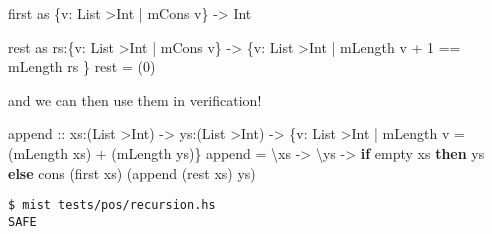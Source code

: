 \documentclass[
]{darts-v2021}
\newenvironment{Shaded}{}{}
\newcommand{\DataTypeTok}[1]{\textcolor[rgb]{0.56,0.13,0.00}{#1}}
\newcommand{\DecValTok}[1]{\textcolor[rgb]{0.25,0.63,0.44}{#1}}
\newcommand{\KeywordTok}[1]{\textcolor[rgb]{0.00,0.44,0.13}{\textbf{#1}}}
\newcommand{\NormalTok}[1]{#1}
\newcommand{\OperatorTok}[1]{\textcolor[rgb]{0.40,0.40,0.40}{#1}}
\newcommand{\OtherTok}[1]{\textcolor[rgb]{0.00,0.44,0.13}{#1}}
\begin{document}
\begin{Shaded}
\begin{Highlighting}[numbers=left,,firstnumber=17,]
\NormalTok{first as \{v}\OperatorTok{:} \DataTypeTok{List} \OperatorTok{\textgreater{}}\DataTypeTok{Int} \OperatorTok{|}\NormalTok{ mCons v\} }\OtherTok{{-}\textgreater{}} \DataTypeTok{Int}
\end{Highlighting}
\end{Shaded}

\begin{Shaded}
\begin{Highlighting}[numbers=left,,firstnumber=20,]
\NormalTok{rest as rs}\OperatorTok{:}\NormalTok{\{v}\OperatorTok{:} \DataTypeTok{List} \OperatorTok{\textgreater{}}\DataTypeTok{Int} \OperatorTok{|}\NormalTok{ mCons v\}}
  \OtherTok{{-}\textgreater{}}\NormalTok{ \{v}\OperatorTok{:} \DataTypeTok{List} \OperatorTok{\textgreater{}}\DataTypeTok{Int} \OperatorTok{|}\NormalTok{ mLength v }\OperatorTok{+} \DecValTok{1} \OperatorTok{==}\NormalTok{ mLength rs \}}
\NormalTok{rest }\OtherTok{=}\NormalTok{ (}\DecValTok{0}\NormalTok{)}
\end{Highlighting}
\end{Shaded}

and we can then use them in verification!

\begin{Shaded}
\begin{Highlighting}[numbers=left,,firstnumber=24,]
\OtherTok{append ::}\NormalTok{ xs}\OperatorTok{:}\NormalTok{(}\DataTypeTok{List} \OperatorTok{\textgreater{}}\DataTypeTok{Int}\NormalTok{)}
  \OtherTok{{-}\textgreater{}}\NormalTok{ ys}\OperatorTok{:}\NormalTok{(}\DataTypeTok{List} \OperatorTok{\textgreater{}}\DataTypeTok{Int}\NormalTok{)}
  \OtherTok{{-}\textgreater{}}\NormalTok{ \{v}\OperatorTok{:} \DataTypeTok{List} \OperatorTok{\textgreater{}}\DataTypeTok{Int} \OperatorTok{|}\NormalTok{ mLength v }\OtherTok{=}\NormalTok{ (mLength xs) }\OperatorTok{+}\NormalTok{ (mLength ys)\}}
\NormalTok{append }\OtherTok{=}\NormalTok{ \textbackslash{}xs }\OtherTok{{-}\textgreater{}}\NormalTok{ \textbackslash{}ys }\OtherTok{{-}\textgreater{}}
  \KeywordTok{if}\NormalTok{ empty xs}
    \KeywordTok{then}\NormalTok{ ys}
    \KeywordTok{else}\NormalTok{ cons (first xs) (append (rest xs) ys)}
\end{Highlighting}
\end{Shaded}

\begin{verbatim}
$ mist tests/pos/recursion.hs
SAFE
\end{verbatim}
\end{document}
